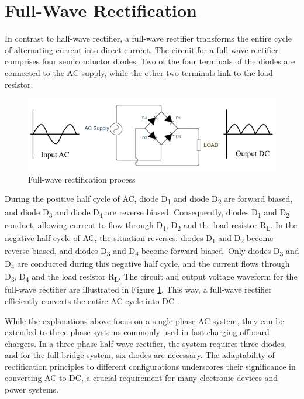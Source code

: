 \documentclass[12pt,a4paper]{book}
\begin{document}
\section{Full-Wave Rectification}
In contrast to half-wave rectifier, a full-wave rectifier transforms the entire cycle of alternating current into direct current. The circuit for a full-wave rectifier comprises four semiconductor diodes. Two of the four terminals of the diodes are connected to the AC supply, while the other two terminals link to the load resistor. 

\begin{figure}[h]
  \centering
  \includegraphics[width=13cm]{image2.png}
  \caption{Full-wave rectification process}
  \label{fig:image2}
\end{figure}

During the positive half cycle of AC, diode D\textsubscript{1} and diode D\textsubscript{2} are forward biased, and diode D\textsubscript{3} and diode D\textsubscript{4} are reverse biased. Consequently, diodes D\textsubscript{1} and D\textsubscript{2} conduct, allowing current to flow through D\textsubscript{1}, D\textsubscript{2} and the load resistor R\textsubscript{L}. In the negative half cycle of AC, the situation reverses: diodes D\textsubscript{1} and D\textsubscript{2} become reverse biased, and diodes D\textsubscript{3} and D\textsubscript{4} become forward biased. Only diodes D\textsubscript{3} and D\textsubscript{4} are conducted during this negative half cycle, and the current flows through D\textsubscript{3}, D\textsubscript{4} and the load resistor R\textsubscript{L}. The circuit and output voltage waveform for the full-wave rectifier are illustrated in Figure \ref{fig:image2}. This way, a full-wave rectifier efficiently converts the entire AC cycle into DC \cite{rectifier2023}.

While the explanations above focus on a single-phase AC system, they can be extended to three-phase systems commonly used in fast-charging offboard chargers. In a three-phase half-wave rectifier, the system requires three diodes, and for the full-bridge system, six diodes are necessary. The adaptability of rectification principles to different configurations underscores their significance in converting AC to DC, a crucial requirement for many electronic devices and power systems.
\end{document}
